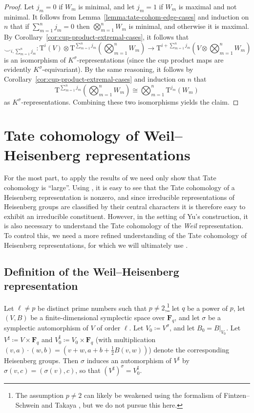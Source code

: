 \documentclass[reqno]{amsart}
\numberwithin{equation}{subsection}
\newcommand{\F}{\mathbf{F}}
\newcommand{\co}{\colon}
\newcommand{\rT}{\ensuremath{\mathrm{T}}\xspace}
\theoremstyle{remark}
\numberwithin{equation}{subsection}
\numberwithin{figure}{subsection}
\begin{document}
\begin{proof}
Let $j_m = 0$ if $W_m$ is minimal, and let $j_m = 1$ if $W_m$ is maximal and not minimal. It follows from Lemma~\ref{lemma:tate-cohom-edge-cases} and induction on $n$ that if $\sum_{m=1}^n j_m = 0$ then $\bigotimes_{m=1}^n W_m$ is minimal, and otherwise it is maximal. By Corollary~\ref{cor:cup-product-extremal-cases}, it follows that
\[
\smile_{i,\sum_{m=1}^n j_m}\co \rT^i(V) \otimes \rT^{\sum_{m=1}^n j_m}\left(\bigotimes_{m=1}^n W_m\right) \to \rT^{i + \sum_{m=1}^n j_m}\left(V \otimes \bigotimes_{m=1}^n W_m\right)
\]
is an isomorphism of $K^\sigma$-representations (since the cup product maps are evidently $K^\sigma$-equivariant). By the same reasoning, it follows by Corollary~\ref{cor:cup-product-extremal-cases} and induction on $n$ that
\[
\rT^{\sum_{m=1}^n j_m}\left(\bigotimes_{m=1}^n W_m\right) \cong \bigotimes_{m=1}^n \rT^{j_m}(W_m)
\]
as $K^\sigma$-representations. Combining these two isomorphisms yields the claim.
\end{proof}



\section{Tate cohomology of Weil--Heisenberg representations}\label{ss:weil-heisenberg}

For the most part, to apply the results of \cite{F24} we need only show that Tate cohomology is ``large''. Using \cite[Lemma~3.1.3]{Cot26b}, it is easy to see that the Tate cohomology of a Heisenberg representation is nonzero, and since irreducible representations of Heisenberg groups are classified by their central characters it is therefore easy to exhibit an irreducible constituent. However, in the setting of Yu's construction, it is also necessary to understand the Tate cohomology of the \emph{Weil} representation. To control this, we need a more refined understanding of the Tate cohomology of Heisenberg representations, for which we will ultimately use \cite[Theorem~3.5.4]{Cot26b}.

\subsection{Definition of the Weil--Heisenberg representation}
Let $\ell \neq p$ be distinct prime numbers such that $p\neq 2$,\footnote{The assumption $p \neq 2$ can likely be weakened using the formalism of Fintzen--Schwein \cite{FS25} and Takaya \cite{Tak26}, but we do not pursue this here.} let $q$ be a power of $p$, let $(V, B)$ be a finite-dimensional symplectic space over $\F_q$, and let $\sigma$ be a symplectic automorphism of $V$ of order $\ell$. Let $V_0 \coloneqq V^\sigma$, and let $B_0 = B|_{V_0}$. Let $V^\sharp \coloneqq V \times \F_q$ and $V_0^\sharp \coloneqq V_0 \times \F_q$ (with multiplication $(v, a) \cdot (w, b) = (v+w, a+b+\frac{1}{2}B(v,w))$) denote the corresponding Heisenberg groups. Then $\sigma$ induces an automorphism of $V^\sharp$ by $\sigma(v, c) = (\sigma(v), c)$, so that $(V^\sharp)^\sigma = V_0^\sharp$.
\end{document}
